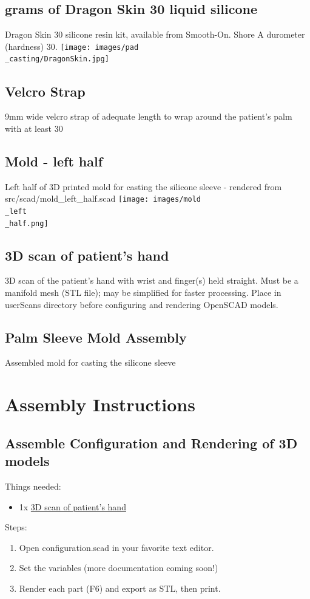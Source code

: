 \documentclass[11pt]{article}
\begin{document}
\hypertarget{thing_g\_dragon\_skin\_30}{\subsection{grams of Dragon Skin 30 liquid silicone}}
Dragon Skin 30 silicone resin kit, available from Smooth-On. Shore A durometer (hardness) 30.
\texttt{[image: images/pad\\\_casting/DragonSkin.jpg]}

\hypertarget{thing_velcro\_strap}{\subsection{Velcro Strap}}
9mm wide velcro strap of adequate length to wrap around the patient's palm with at least 30%

\hypertarget{thing_mold\_left\_half}{\subsection{Mold - left half}}
Left half of 3D printed mold for casting the silicone sleeve - rendered from src/scad/mold_left_half.scad
\texttt{[image: images/mold\\\_left\\\_half.png]}

\hypertarget{thing_hand\_scan}{\subsection{3D scan of patient's hand}}
3D scan of the patient's hand with wrist and finger(s) held straight. Must be a manifold mesh (STL file); may be simplified for faster processing. Place in userScans directory before configuring and rendering OpenSCAD models.

\hypertarget{thing_mold\_assembly}{\subsection{Palm Sleeve Mold Assembly}}
Assembled mold for casting the silicone sleeve

\newpage

\section{Assembly Instructions}

\subsection{Assemble Configuration and Rendering of 3D models}
Things needed:
\begin{itemize}
\item 1x \hyperlink{thing_hand\_scan}{3D scan of patient's hand}
\end{itemize}
Steps:
\begin{enumerate}
\item Open configuration.scad in your favorite text editor.
\item Set the variables (more documentation coming soon!)
\item Render each part (F6) and export as STL, then print.
\end{enumerate}
\end{document}
